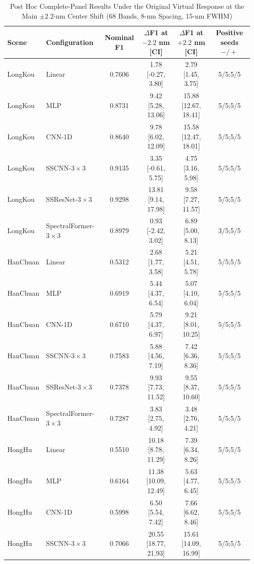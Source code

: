 \begin{table}[!t]
\caption{Post Hoc Complete-Panel Results Under the Original Virtual Response at the Main $\pm2.2$-nm Center Shift (68 Bands, 8-nm Spacing, 15-nm FWHM)}
\label{tab:strategy_a_primary}
\centering
\footnotesize
\setlength{\tabcolsep}{1.8pt}
\renewcommand{\arraystretch}{0.98}
\begin{tabular}{llcccc}
\hline
Scene & Configuration & Nominal F1 & $\Delta$F1 at $-2.2$ nm [CI] & $\Delta$F1 at $+2.2$ nm [CI] & Positive seeds $-/+$ \\
\hline
LongKou & Linear & 0.7606 & 1.78 [-0.27, 3.80] & 2.79 [1.45, 3.75] & 5/5;5/5 \\
LongKou & MLP & 0.8731 & 9.42 [5.28, 13.06] & 15.88 [12.67, 18.41] & 5/5;5/5 \\
LongKou & CNN-1D & 0.8640 & 9.78 [6.02, 12.09] & 15.58 [12.47, 18.01] & 5/5;5/5 \\
LongKou & SSCNN-$3\times3$ & 0.9135 & 3.35 [-0.61, 5.75] & 4.75 [3.16, 5.98] & 5/5;5/5 \\
LongKou & SSResNet-$3\times3$ & 0.9298 & 13.81 [9.14, 17.98] & 9.58 [7.27, 11.57] & 5/5;5/5 \\
LongKou & SpectralFormer-$3\times3$ & 0.8979 & 0.93 [-2.42, 3.02] & 6.89 [5.00, 8.13] & 3/5;5/5 \\
\hline
HanChuan & Linear & 0.5312 & 2.68 [1.77, 3.58] & 5.21 [4.51, 5.78] & 5/5;5/5 \\
HanChuan & MLP & 0.6919 & 5.44 [4.37, 6.54] & 5.07 [4.10, 6.04] & 5/5;5/5 \\
HanChuan & CNN-1D & 0.6710 & 5.79 [4.37, 6.97] & 9.21 [8.01, 10.25] & 5/5;5/5 \\
HanChuan & SSCNN-$3\times3$ & 0.7583 & 5.88 [4.56, 7.19] & 7.42 [6.36, 8.36] & 5/5;5/5 \\
HanChuan & SSResNet-$3\times3$ & 0.7378 & 9.93 [7.73, 11.52] & 9.55 [8.37, 10.60] & 5/5;5/5 \\
HanChuan & SpectralFormer-$3\times3$ & 0.7287 & 3.83 [2.75, 4.92] & 3.48 [2.76, 4.21] & 5/5;5/5 \\
\hline
HongHu & Linear & 0.5510 & 10.18 [8.78, 11.29] & 7.39 [6.34, 8.26] & 5/5;5/5 \\
HongHu & MLP & 0.6164 & 11.38 [10.09, 12.49] & 5.63 [4.77, 6.45] & 5/5;5/5 \\
HongHu & CNN-1D & 0.5998 & 6.50 [5.54, 7.42] & 7.66 [6.62, 8.46] & 5/5;5/5 \\
HongHu & SSCNN-$3\times3$ & 0.7066 & 20.55 [18.77, 21.93] & 15.61 [14.09, 16.99] & 5/5;5/5 \\

\end{tabular}
\end{table}
